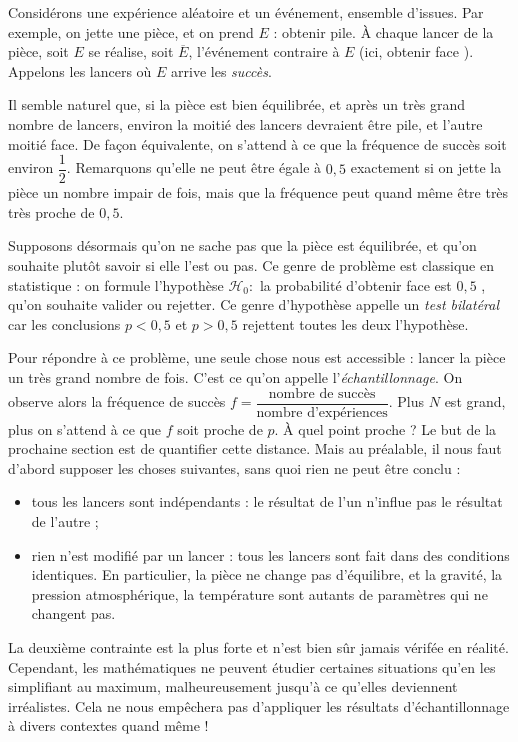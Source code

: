 Considérons une expérience aléatoire et un événement, ensemble d'issues.
Par exemple, on jette une pièce, et on prend $E$ : \og obtenir pile. \fg
À chaque lancer de la pièce, soit $E$ se réalise, soit $\overline{E}$, l'événement contraire à $E$ (ici, \og obtenir face \fg).
Appelons les lancers où $E$ arrive les \emph{succès}.

Il semble naturel que, si la pièce est bien équilibrée, et après un très grand nombre de lancers, environ la moitié des lancers devraient être pile, et l'autre moitié face.
De façon équivalente, on s'attend à ce que la fréquence de succès soit environ $\dfrac12$.
Remarquons qu'elle ne peut être égale à $0,5$ exactement si on jette la pièce un nombre impair de fois, mais que la fréquence peut quand même être très très proche de $0,5$.

Supposons désormais qu'on ne sache pas que la pièce est équilibrée, et qu'on souhaite plutôt savoir si elle l'est ou pas.
Ce genre de problème est classique en statistique : on formule l'hypothèse $\mathcal{H}_0 :$ \og la probabilité d'obtenir face est $0,5$ \fg, qu'on souhaite valider ou rejetter.
Ce genre d'hypothèse appelle un \emph{test bilatéral} car les conclusions $p< 0,5$ et $p>0,5$ rejettent toutes les deux l'hypothèse.

Pour répondre à ce problème, une seule chose nous est accessible : lancer la pièce un très grand nombre de fois.
C'est ce qu'on appelle l'\emph{échantillonnage}.
On observe alors la fréquence de succès $f = \dfrac{\text{nombre de succès}}{\text{nombre d'expériences}}$.
Plus $N$ est grand, plus on s'attend à ce que $f$ soit proche de $p$. À quel point proche ? Le but de la prochaine section est de quantifier cette distance.
Mais au préalable, il nous faut d'abord supposer les choses suivantes, sans quoi rien ne peut être conclu :
	\begin{itemize}
		\item tous les lancers sont indépendants : le résultat de l'un n'influe pas le résultat de l'autre ;
		\item rien n'est modifié par un lancer : tous les lancers sont fait dans des conditions identiques. En particulier, la pièce ne change pas d'équilibre, et la gravité, la pression atmosphérique, la température sont autants de paramètres qui ne changent pas.
	\end{itemize}
La deuxième contrainte est la plus forte et n'est bien sûr jamais vérifée en réalité.
Cependant, les mathématiques ne peuvent étudier certaines situations qu'en les simplifiant au maximum, malheureusement jusqu'à ce qu'elles deviennent irréalistes.
Cela ne nous empêchera pas d'appliquer les résultats d'échantillonnage à divers contextes quand même !


